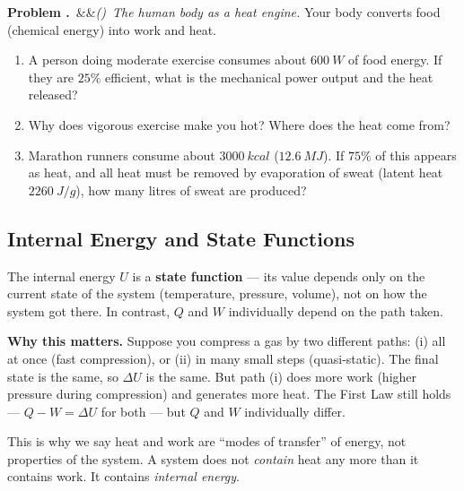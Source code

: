 \documentclass[12pt, a4paper, twoside]{book}
\newcounter{problem}[chapter]
\newcommand{\problem}[1][]{\refstepcounter{problem}\medskip\noindent
  \textcolor{accent}{\textbf{Problem \theproblem.}}\ \ifx&#1&\else\textit{(#1)}\ \fi}
\begin{document}
\begin{explobox}
\problem \textit{The human body as a heat engine.} Your body converts food (chemical energy) into work and heat.
\begin{enumerate}[label=(\alph*)]
  \item A person doing moderate exercise consumes about $\SI{600}{W}$ of food energy. If they are $25\%$ efficient, what is the mechanical power output and the heat released?
  \item Why does vigorous exercise make you hot? Where does the heat come from?
  \item Marathon runners consume about $\SI{3000}{kcal}$ ($\SI{12.6}{MJ}$). If $75\%$ of this appears as heat, and all heat must be removed by evaporation of sweat (latent heat $\SI{2260}{J/g}$), how many litres of sweat are produced?
\end{enumerate}
\end{explobox}

\subsection{Internal Energy and State Functions}

The internal energy $U$ is a \textbf{state function} --- its value depends only on the current state of the system (temperature, pressure, volume), not on how the system got there. In contrast, $Q$ and $W$ individually depend on the path taken.

\begin{discoverybox}
\textbf{Why this matters.} Suppose you compress a gas by two different paths: (i) all at once (fast compression), or (ii) in many small steps (quasi-static). The final state is the same, so $\Delta U$ is the same. But path (i) does more work (higher pressure during compression) and generates more heat. The First Law still holds --- $Q - W = \Delta U$ for both --- but $Q$ and $W$ individually differ.

This is why we say heat and work are ``modes of transfer'' of energy, not properties of the system. A system does not \textit{contain} heat any more than it contains work. It contains \textit{internal energy}.
\end{discoverybox}
\end{document}
